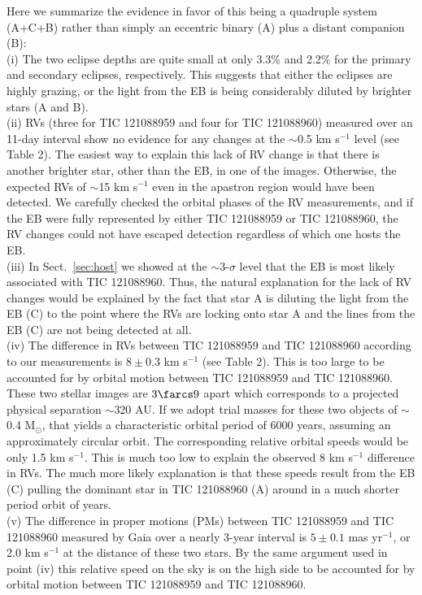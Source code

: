 \documentclass[fleqn,usenatbib]{mnras} %
\begin{document}
Here we summarize the evidence in favor of this being a quadruple system (A+C+B) rather than simply an eccentric binary (A) plus a distant companion (B): \\
  \indent (i) The two eclipse depths are quite small at only 3.3\% and 2.2\% for the primary and secondary eclipses, respectively.
  This suggests that either the eclipses are highly grazing, or the light from the EB is being considerably diluted by brighter stars (A and B).\\
   \indent (ii) RVs (three for TIC 121088959 and four for TIC 121088960) measured over an 11-day interval show no evidence for any changes at the $\sim$0.5 km s$^{-1}$ level (see Table 2). The easiest way to explain this lack of RV change is that there is another brighter star, other than the EB, in one of the images.  Otherwise, the expected RVs of $\sim$15 km s$^{-1}$ even in the apastron region would have been detected.  We carefully checked the orbital phases of the RV measurements, and if the EB were fully represented by either TIC 121088959 or TIC 121088960, the RV changes could not have escaped detection regardless of which one hosts the EB.\\
   \indent (iii) In Sect.~\ref{sec:host} we showed at the $\sim$3-$\sigma$ level that the EB is most likely associated with TIC 121088960. Thus, the natural explanation for the lack of RV changes would be explained by the fact that star A is diluting the light from the EB (C) to the point where the RVs are locking onto star A and the lines from the EB (C) are not being detected at all.  \\
   \indent (iv) The difference in RVs between TIC 121088959 and TIC 121088960 according to our measurements is $8 \pm 0.3$ km s$^{-1}$ (see Table 2). This is too large to be accounted for by orbital motion between TIC 121088959 and TIC 121088960.  These two stellar images are $3\farcs9$ apart which corresponds to a projected physical separation $\sim$320 AU.  If we adopt trial masses for these two objects of $\sim$0.4 M$_\odot$, that yields a characteristic orbital period of 6000 years, assuming an approximately circular orbit.  The corresponding relative orbital speeds would be only 1.5 km s$^{-1}$.  This is much too low to explain the observed 8 km s$^{-1}$ difference in RVs.  The much more likely explanation is that these speeds result from the EB (C) pulling the dominant star in TIC 121088960 (A) around in a much shorter period orbit of years. \\
    \indent (v) The difference in proper motions (PMs) between TIC 121088959 and TIC 121088960 measured by Gaia over a nearly 3-year interval is $5 \pm 0.1$ mas yr$^{-1}$, or 2.0 km s$^{-1}$ at the distance of these two stars. By the same argument used in point (iv) this relative speed on the sky is on the high side to be accounted for by orbital motion between TIC 121088959 and TIC 121088960. \\
\end{document}
